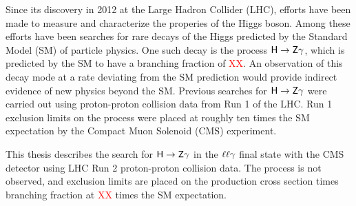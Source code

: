 \abstract
    
    Since its discovery in 2012 at the Large Hadron Collider (LHC), efforts have been made 
to measure and characterize the properies of the Higgs boson. Among these efforts have
been searches for rare decays of the Higgs predicted by the Standard Model (SM) of particle
physics. One such decay is the process $\sf H\rightarrow Z\gamma$, which is predicted
by the SM to have a branching fraction of \textcolor{red}{XX}. An observation 
of this decay mode at a rate deviating from the SM prediction would provide indirect 
evidence of new physics beyond the SM. Previous searches for $\sf H\rightarrow Z\gamma$ 
were carried out using proton-proton collision data from Run 1 of the LHC. Run 1 exclusion
limits on the process were placed at roughly ten times the SM expectation by 
the Compact Muon Solenoid (CMS) experiment. 

    This thesis describes the search for $\sf H\rightarrow Z\gamma$ in the $\sf \ell\ell\gamma$ 
final state with the CMS detector using LHC Run 2 proton-proton collision data. 
The process is not observed, and exclusion limits are placed on the production cross section 
times branching fraction at \textcolor{red}{XX} times the SM expectation.
